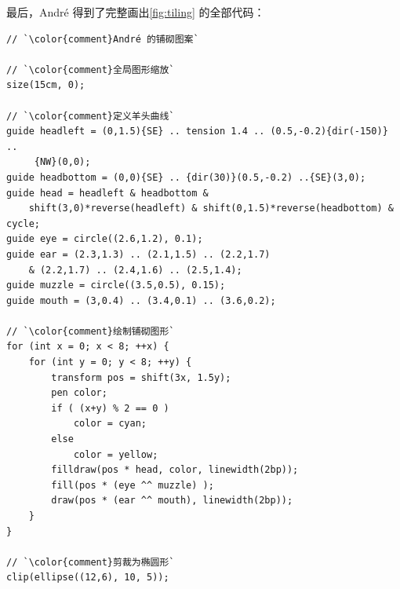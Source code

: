 最后，André 得到了完整画出\autoref{fig:tiling} 的全部代码：
\begin{lstlisting}
// `\color{comment}André 的铺砌图案`

// `\color{comment}全局图形缩放`
size(15cm, 0);

// `\color{comment}定义羊头曲线`
guide headleft = (0,1.5){SE} .. tension 1.4 .. (0.5,-0.2){dir(-150)} ..
     {NW}(0,0);
guide headbottom = (0,0){SE} .. {dir(30)}(0.5,-0.2) ..{SE}(3,0);
guide head = headleft & headbottom &
    shift(3,0)*reverse(headleft) & shift(0,1.5)*reverse(headbottom) & cycle;
guide eye = circle((2.6,1.2), 0.1);
guide ear = (2.3,1.3) .. (2.1,1.5) .. (2.2,1.7)
    & (2.2,1.7) .. (2.4,1.6) .. (2.5,1.4);
guide muzzle = circle((3.5,0.5), 0.15);
guide mouth = (3,0.4) .. (3.4,0.1) .. (3.6,0.2);

// `\color{comment}绘制铺砌图形`
for (int x = 0; x < 8; ++x) {
    for (int y = 0; y < 8; ++y) {
        transform pos = shift(3x, 1.5y);
        pen color;
        if ( (x+y) % 2 == 0 )
            color = cyan;
        else
            color = yellow;
        filldraw(pos * head, color, linewidth(2bp));
        fill(pos * (eye ^^ muzzle) );
        draw(pos * (ear ^^ mouth), linewidth(2bp));
    }
}

// `\color{comment}剪裁为椭圆形`
clip(ellipse((12,6), 10, 5));
\end{lstlisting}

\endinput


